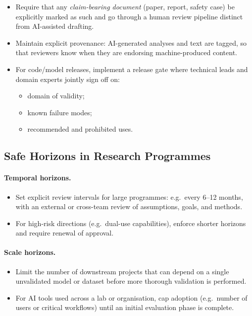 \begin{itemize}
  \item Require that any \emph{claim-bearing document} (paper, report,
        safety case) be explicitly marked as such and go through a
        human review pipeline distinct from AI-assisted drafting.
  \item Maintain explicit provenance:
        AI-generated analyses and text are tagged, so that reviewers
        know when they are endorsing machine-produced content.
  \item For code/model releases, implement a release gate where
        technical leads and domain experts jointly sign off on:
        \begin{itemize}
          \item domain of validity;
          \item known failure modes;
          \item recommended and prohibited uses.
        \end{itemize}
\end{itemize}

\subsection{Safe Horizons in Research Programmes}

\paragraph{Temporal horizons.}

\begin{itemize}
  \item Set explicit review intervals for large programmes:
        e.g.\ every 6--12 months, with an external or cross-team review
        of assumptions, goals, and methods.
  \item For high-risk directions (e.g.\ dual-use capabilities),
        enforce shorter horizons and require renewal of approval.
\end{itemize}

\paragraph{Scale horizons.}

\begin{itemize}
  \item Limit the number of downstream projects that can depend on a
        single unvalidated model or dataset before more thorough
        validation is performed.
  \item For AI tools used across a lab or organisation, cap adoption
        (e.g.\ number of users or critical workflows) until an initial
        evaluation phase is complete.
\end{itemize}

